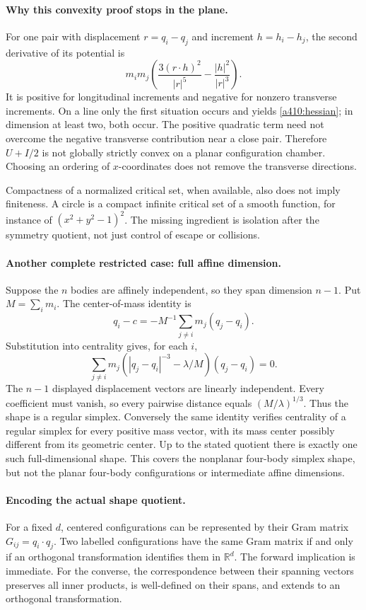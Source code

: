 \documentclass[11pt]{article}
\begin{document}
\paragraph{Why this convexity proof stops in the plane.}
For one pair with displacement $r=q_i-q_j$ and increment
$h=h_i-h_j$, the second derivative of its potential is
\[
 m_im_j\left(\frac{3(r\cdot h)^2}{|r|^5}
                         -\frac{|h|^2}{|r|^3}\right).
\]
It is positive for longitudinal increments and negative for
nonzero transverse increments. On a line only the first situation
occurs and yields \eqref{a410:hessian}; in dimension at least two,
both occur. The positive quadratic term need not overcome the
negative transverse contribution near a close pair. Therefore
$U+I/2$ is not globally strictly convex on a planar configuration
chamber. Choosing an ordering of $x$-coordinates does not remove
the transverse directions.

Compactness of a normalized critical set, when available, also does
not imply finiteness. A circle is a compact infinite critical set of
a smooth function, for instance of $(x^2+y^2-1)^2$. The missing
ingredient is isolation after the symmetry quotient, not just
control of escape or collisions.

\paragraph{Another complete restricted case: full affine dimension.}
Suppose the $n$ bodies are affinely independent, so they span
dimension $n-1$. Put $M=\sum_i m_i$. The center-of-mass identity is
\[
 q_i-c=-M^{-1}\sum_{j\ne i}m_j(q_j-q_i).
\]
Substitution into centrality gives, for each $i$,
\[
 \sum_{j\ne i}m_j\left(|q_j-q_i|^{-3}-\lambda/M\right)
                                      (q_j-q_i)=0.
\]
The $n-1$ displayed displacement vectors are linearly independent.
Every coefficient must vanish, so every pairwise distance equals
$(M/\lambda)^{1/3}$. Thus the shape is a regular simplex.
Conversely the same identity verifies centrality of a regular
simplex for every positive mass vector, with its mass center
possibly different from its geometric center. Up to the stated
quotient there is exactly one such full-dimensional shape.
This covers the nonplanar four-body simplex shape, but not the
planar four-body configurations or intermediate affine dimensions.

\paragraph{Encoding the actual shape quotient.}
For a fixed $d$, centered configurations can be represented by their
Gram matrix $G_{ij}=q_i\cdot q_j$. Two labelled configurations have
the same Gram matrix if and only if an orthogonal transformation
identifies them in $\mathbb R^d$. The forward implication is
immediate. For the converse, the correspondence between their
spanning vectors preserves all inner products, is well-defined
on their spans, and extends to an orthogonal transformation.
\end{document}
